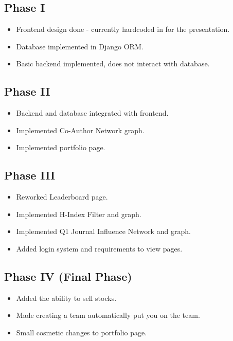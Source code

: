 \documentclass[11pt]{article}
\begin{document}
    \subsection{Phase I}
        \begin{itemize}
            \item Frontend design done - currently hardcoded in for the presentation.
            \item Database implemented in Django ORM.
            \item Basic backend implemented, does not interact with database.
        \end{itemize}

    \subsection{Phase II}
        \begin{itemize}
            \item Backend and database integrated with frontend.
            \item Implemented Co-Author Network graph.
            \item Implemented portfolio page.
        \end{itemize}

    \subsection{Phase III}
        \begin{itemize}
            \item Reworked Leaderboard page.
            \item Implemented H-Index Filter and graph.
            \item Implemented Q1 Journal Influence Network and graph.
            \item Added login system and requirements to view pages.
        \end{itemize}

    \subsection{Phase IV (Final Phase)}
        \begin{itemize}
            \item Added the ability to sell stocks.
            \item Made creating a team automatically put you on the team.
            \item Small cosmetic changes to portfolio page.
        \end{itemize}
\end{document}
